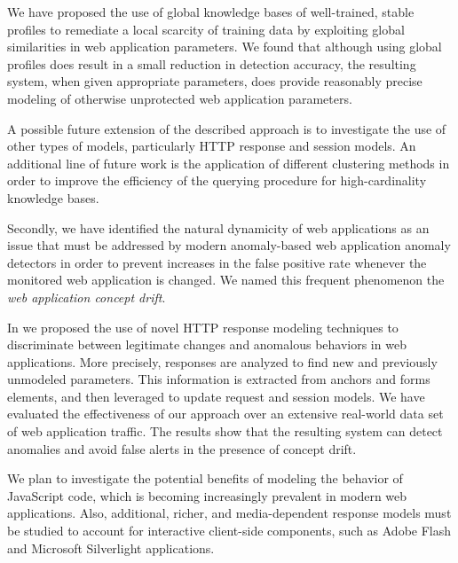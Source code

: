 We have proposed the use of global knowledge bases of well-trained, stable profiles to remediate a local scarcity of training data by exploiting global similarities in web application parameters. We found that although using global profiles does result in a small reduction in detection accuracy, the resulting system, when given appropriate parameters, does provide reasonably precise modeling of otherwise unprotected web application parameters.

A possible future extension of the described approach is to investigate the use of other types of models, particularly \ac{HTTP} response and session models. An additional line of future work is the application of different clustering methods in order to improve the efficiency of the querying procedure for high-cardinality knowledge bases.

Secondly, we have identified the natural dynamicity of web applications as an issue that must be addressed by modern anomaly-based web application anomaly detectors in order to prevent increases in the false positive rate whenever the monitored web application is changed. We named this frequent phenomenon the \emph{web application concept drift}.

In \citep{2009_maggi_robertson_kruegel_vigna} we proposed the use of novel \ac{HTTP} response modeling techniques to discriminate between legitimate changes and anomalous behaviors in web applications. More precisely, responses are analyzed to find new and previously unmodeled parameters. This information is extracted from anchors and forms elements, and then leveraged to update request and session models. We have evaluated the effectiveness of our approach over an extensive real-world data set of web application traffic. The results show that the resulting system can detect anomalies and avoid false alerts in the presence of concept drift.

We plan to investigate the potential benefits of modeling the behavior of JavaScript code, which is becoming increasingly prevalent in modern web applications. Also, additional, richer, and media-dependent response models must be studied to account for interactive client-side components, such as Adobe Flash and Microsoft Silverlight applications.

